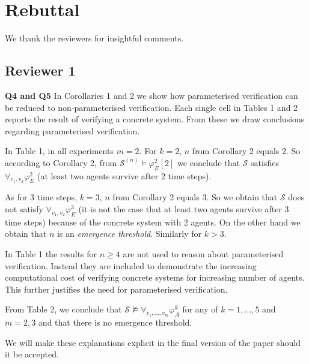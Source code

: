 \documentclass{article}
\begin{document}




\section*{Rebuttal}
We thank the reviewers for insightful comments. 

\subsection*{Reviewer 1}
\textbf{Q4 and Q5}
In Corollaries 1 and 2 we show how parameterised
verification can be reduced to non-parameterised verification. Each
single cell in Tables 1 and 2 reports the result of verifying a
concrete system. From these we draw conclusions regarding
parameterised verification.

In Table 1, in all experiments $m=2$.
%
For $k=2$, $n$ from Corollary 2 equals 2. So according to Corollary 2,
from $\mathcal{S}^{(n)} \models \varphi^2_E[2]$ we conclude that
$\mathcal{S}$ satisfies $\forall_{v_1,v_2} \varphi^2_E$ (at least two
agents survive after 2 time steps).

As for 3 time steps, $k=3$, $n$ from Corollary 2 equals 3. So we
obtain that $\mathcal{S}$ does not satisfy
$\forall_{v_1,v_2} \varphi^3_E$ (it is not the case that at least two
agents survive after 3 time steps) because of the concrete system with
2 agents. On the other hand we obtain that $n$ is an \emph{emergence
  threshold}. Similarly for $k>3$.

In Table 1 the results for $n\geq 4$ are not used to reason about
parameterised verification. Instead they are included to demonstrate
the increasing computational cost of verifying concrete systems for
increasing number of agents. This further justifies the need for
parameterised verification. 

From Table 2, we conclude that
$\mathcal{S}\not\models\forall_{v_1,\dots,v_m}\varphi^k_A$ for any of
$k=1,\dots,5$ and $m=2,3$ and that there is no emergence threshold.

We will make these explanations explicit in the final
version of the paper should it be accepted.
\end{document}
